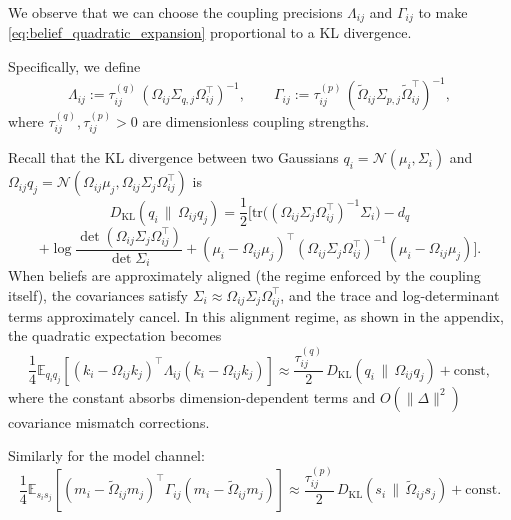 \documentclass[11pt]{article}
\begin{document}
We observe that we can choose the coupling precisions $\Lambda_{ij}$ and $\Gamma_{ij}$ to make \eqref{eq:belief_quadratic_expansion} proportional to a KL divergence.

Specifically, we define
\begin{equation}
\Lambda_{ij}:=\tau^{(q)}_{ij}\,(\Omega_{ij}\Sigma_{q,j}\Omega_{ij}^\top)^{-1},
\qquad 
\Gamma_{ij}:=\tau^{(p)}_{ij}\,(\tilde{\Omega}_{ij}\Sigma_{p,j}\tilde{\Omega}_{ij}^\top)^{-1},
\label{eq:precision_choice}
\end{equation}
where $\tau^{(q)}_{ij}, \tau^{(p)}_{ij} > 0$ are dimensionless coupling strengths.

Recall that the KL divergence between two Gaussians $q_i = \mathcal{N}(\mu_i,\Sigma_i)$ and $\Omega_{ij}q_j = \mathcal{N}(\Omega_{ij}\mu_j, \Omega_{ij}\Sigma_j\Omega_{ij}^\top)$ is
$$
D_{\mathrm{KL}}(q_i\,\|\,\Omega_{ij}q_j)
= \frac{1}{2}
\Big[
\mathrm{tr}\!\big((\Omega_{ij}\Sigma_j\Omega_{ij}^\top)^{-1}\Sigma_i\big)
- d_q
$$
$$
+ \log \frac{\det(\Omega_{ij}\Sigma_j\Omega_{ij}^\top)}{\det \Sigma_i}
+ (\mu_i - \Omega_{ij}\mu_j)^\top
(\Omega_{ij}\Sigma_j\Omega_{ij}^\top)^{-1}
(\mu_i - \Omega_{ij}\mu_j)
\Big].
\label{eq:kl_full}
$$
When beliefs are approximately aligned (the regime enforced by the coupling itself), the covariances satisfy $\Sigma_i \approx \Omega_{ij}\Sigma_j\Omega_{ij}^\top$, and the trace and log-determinant terms approximately cancel. In this alignment regime, as shown in the appendix, the quadratic expectation becomes
\begin{equation}
\frac{1}{4}\mathbb{E}_{q_i q_j}
[(k_i-\Omega_{ij}k_j)^\top\Lambda_{ij}(k_i-\Omega_{ij}k_j)]
\approx
\frac{\tau^{(q)}_{ij}}{2}\,D_{\mathrm{KL}}(q_i\,\|\,\Omega_{ij}q_j)+\text{const},
\label{eq:belief_kl_relation}
\end{equation}
where the constant absorbs dimension-dependent terms and $O(\|\Delta\|^2)$ covariance mismatch corrections.

Similarly for the model channel:
\begin{equation}
\frac{1}{4}\mathbb{E}_{s_i s_j}
[(m_i-\tilde{\Omega}_{ij}m_j)^\top\Gamma_{ij}(m_i-\tilde{\Omega}_{ij}m_j)]
\approx
\frac{\tau^{(p)}_{ij}}{2}\,D_{\mathrm{KL}}(s_i\,\|\,\tilde{\Omega}_{ij}s_j)+\text{const}.
\label{eq:model_kl_relation}
\end{equation}
\end{document}
